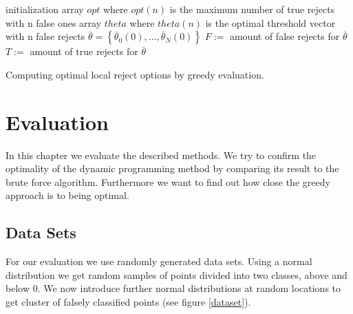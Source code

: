 \begin{algorithm}[!htbp]
 initialization\;
 array $opt$ where $opt(n)$ is the maximum number of true rejects with n false ones \;
 array $theta$ where $theta(n)$ is the optimal threshold vector with n false rejects \; 
 $\bar{\theta} = \left\{\bar{\theta}_0(0),...,\bar{\theta}_N(0)\right\}$ \; 
 $F :=$ amount of false rejects for $\bar{\theta}$ \;
 $T :=$ amount of true rejects for $\bar{\theta}$ \;
 \BlankLine \BlankLine
 \caption{Computing optimal local reject options by greedy evaluation.}
 \label{greedy}
\end{algorithm}

\section{Evaluation}
In this chapter we evaluate the described methods. We try to confirm the optimality of the dynamic programming method by comparing its result to the brute force algorithm. Furthermore we want to find out how close the greedy approach is to being optimal.

\subsection{Data Sets}
For our evaluation we use randomly generated data sets. Using a normal distribution we get random samples of points divided into two classes, above and below $0$. We now introduce further normal distributions at random locations to get cluster of falsely classified points (see figure \ref{dataset}).


